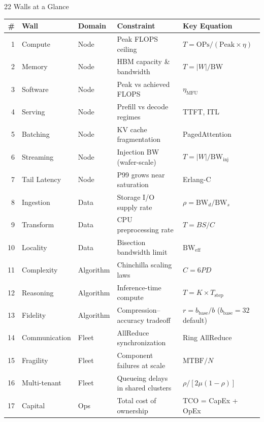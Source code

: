 \begin{frame}{22 Walls at a Glance}
\centering
\scriptsize
\setlength{\tabcolsep}{3pt}
\begin{tabular}{@{}rllll@{}}
\toprule
\textbf{\#} & \textbf{Wall} & \textbf{Domain} & \textbf{Constraint} & \textbf{Key Equation} \\
\midrule
1  & Compute       & Node      & Peak FLOPS ceiling            & $T = \text{OPs} / (\text{Peak} \times \eta)$ \\
2  & Memory        & Node      & HBM capacity \& bandwidth     & $T = |W| / \text{BW}$ \\
3  & Software      & Node      & Peak vs achieved FLOPS        & $\eta_{\text{MFU}}$ \\
4  & Serving       & Node      & Prefill vs decode regimes     & TTFT, ITL \\
5  & Batching      & Node      & KV cache fragmentation        & PagedAttention \\
6  & Streaming     & Node      & Injection BW (wafer-scale)    & $T = |W| / \text{BW}_{\text{inj}}$ \\
7  & Tail Latency  & Node      & P99 grows near saturation     & Erlang-C \\
\midrule
8  & Ingestion     & Data      & Storage I/O supply rate       & $\rho = \text{BW}_d / \text{BW}_s$ \\
9  & Transform     & Data      & CPU preprocessing rate        & $T = BS / C$ \\
10 & Locality      & Data      & Bisection bandwidth limit     & $\text{BW}_{\text{eff}}$ \\
\midrule
11 & Complexity    & Algorithm & Chinchilla scaling laws       & $C = 6PD$ \\
12 & Reasoning     & Algorithm & Inference-time compute        & $T = K \times T_{\text{step}}$ \\
13 & Fidelity      & Algorithm & Compression--accuracy tradeoff & $r = b_{\text{base}}/b$ ($b_{\text{base}}{=}32$ default) \\
\midrule
14 & Communication & Fleet     & AllReduce synchronization     & Ring AllReduce \\
15 & Fragility     & Fleet     & Component failures at scale   & $\text{MTBF}/N$ \\
16 & Multi-tenant  & Fleet     & Queueing delays in shared clusters & $\rho / [2\mu(1{-}\rho)]$ \\
\midrule
17 & Capital       & Ops       & Total cost of ownership       & TCO = CapEx + OpEx \\

\end{tabular}
\end{frame}
